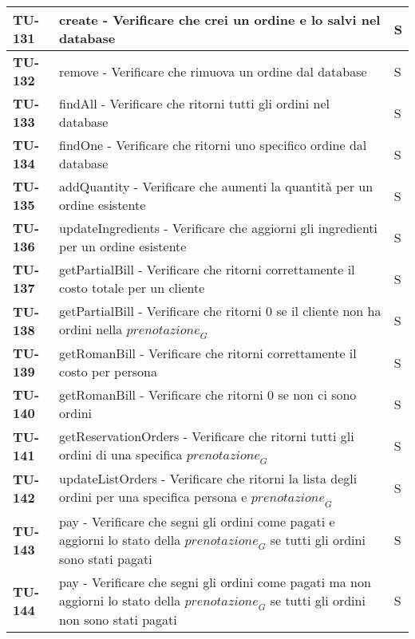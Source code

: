 \begin{longtable}{|>{\centering\arraybackslash}p{2cm}|p{15cm}|p{1cm}|}
  \hline
  \rowcolor{gray!10}
  \textbf{TU-131} & create - Verificare che crei un ordine e lo salvi nel database  & S \\ 
  \hline
  \rowcolor{gray!10}
  \textbf{TU-132} & remove - Verificare che rimuova un ordine dal database  & S \\ 
  \hline
  \rowcolor{gray!10}
  \textbf{TU-133} & findAll - Verificare che ritorni tutti gli ordini nel database  & S \\ 
  \hline
  \rowcolor{gray!10}
  \textbf{TU-134} & findOne - Verificare che ritorni uno specifico ordine dal database  & S \\ 
  \hline
  \rowcolor{gray!10}
  \textbf{TU-135} & addQuantity - Verificare che aumenti la quantità per un ordine esistente  & S \\ 
  \hline
  \rowcolor{gray!10}
  \textbf{TU-136} & updateIngredients - Verificare che aggiorni gli ingredienti per un ordine esistente  & S \\ 
  \hline
  \rowcolor{gray!10}
  \textbf{TU-137} & getPartialBill - Verificare che ritorni correttamente il costo totale per un cliente & S \\ 
  \hline
  \rowcolor{gray!10}
  \textbf{TU-138} & getPartialBill - Verificare che ritorni 0 se il cliente non ha ordini nella $\textit{prenotazione}_G$ & S \\ 
  \hline
  \rowcolor{gray!10}
  \textbf{TU-139} & getRomanBill - Verificare che ritorni correttamente il costo per persona  & S \\ 
  \hline
  \rowcolor{gray!10}
  \textbf{TU-140} & getRomanBill - Verificare che ritorni 0 se non ci sono ordini  & S \\ 
  \hline
  \rowcolor{gray!10}
  \textbf{TU-141} & getReservationOrders - Verificare che ritorni tutti gli ordini di una specifica $\textit{prenotazione}_G$  & S \\ 
  \hline
  \rowcolor{gray!10}
  \textbf{TU-142} & updateListOrders - Verificare che ritorni la lista degli ordini per una specifica persona e $\textit{prenotazione}_G$  & S \\ 
  \hline
  \rowcolor{gray!10}
  \textbf{TU-143} & pay - Verificare che segni gli ordini come pagati e aggiorni lo stato della $\textit{prenotazione}_G$ se tutti gli ordini sono stati pagati   & S \\ 
  \hline
  \rowcolor{gray!10}
  \textbf{TU-144} & pay - Verificare che segni gli ordini come pagati ma non aggiorni lo stato della $\textit{prenotazione}_G$ se tutti gli ordini non sono stati pagati   & S \\ 

\end{longtable}
